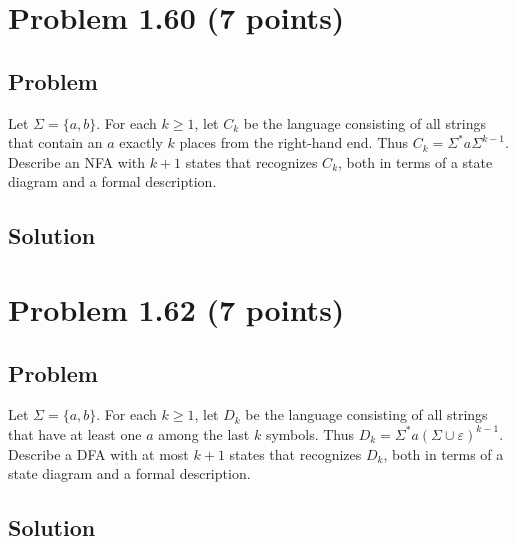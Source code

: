 \documentclass{article}
\begin{document}
\begin{empfile}
\section*{Problem 1.60 (7 points)}

\subsection*{Problem}

Let $\Sigma=\{a,b\}$. For each $k\geq 1$, let $C_k$ be the language
consisting of all strings that contain an $a$ exactly $k$ places
from the right-hand end. Thus $C_k=\Sigma^*a\Sigma^{k-1}$. Describe
an NFA with $k+1$ states that recognizes $C_k$, both in terms of a
state diagram and a formal description.

\subsection*{Solution}

\section*{Problem 1.62 (7 points)}

\subsection*{Problem}

Let $\Sigma=\{a,b\}$. For each $k\geq 1$, let $D_k$ be the language
consisting of all strings that have at least one $a$ among the last
$k$ symbols. Thus $D_k=\Sigma^*a(\Sigma\cup\varepsilon)^{k-1}$.
Describe a DFA with at most $k+1$ states that recognizes $D_k$, both
in terms of a state diagram and a formal description.

\subsection*{Solution}

\end{empfile}
\immediate{}
\end{document}
